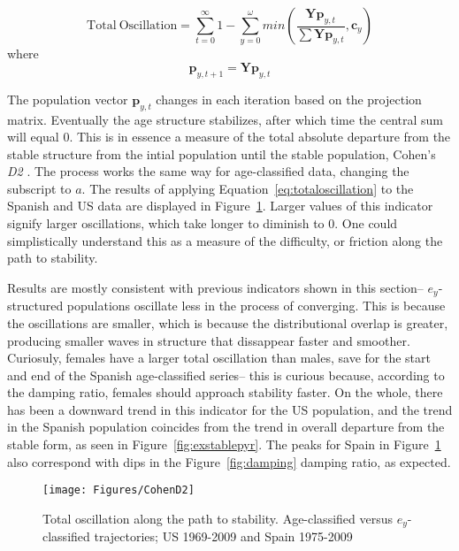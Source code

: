 \begin{equation}
\label{eq:totaloscillation}
\mathrm{Total~Oscillation} = \sum _{t=0} ^\infty 1 - \sum _{y=0} ^\omega
min \left( \frac{\boldsymbol{Y} \boldsymbol{p}_{y,t}}{\sum \boldsymbol{Y}
\boldsymbol{p}_{y,t}}, \boldsymbol{c}_y \right)
\end{equation}
where
\begin{equation}
\boldsymbol{p}_{y,t+1} = \boldsymbol{Y} \boldsymbol{p}_{y,t}
\end{equation}

The population vector $\textbf{p}_{y,t}$ changes in each iteration based on the
projection matrix. Eventually the age structure stabilizes, after which time the central sum will
equal 0. This is in essence a measure of the total absolute departure from the
stable structure from the intial population until the stable population,
Cohen's \textit{D2} \citep{caswell2001matrix}. The process works the same way
for age-classified data, changing the subscript to $a$. The results of applying
Equation~\eqref{eq:totaloscillation} to the Spanish and US data are displayed
in Figure~\ref{fig:exCohenD2}. Larger values of this indicator signify larger
oscillations, which take longer to diminish to 0. One could
simplistically understand this as a measure of the difficulty, or friction along
the path to stability.

Results are mostly consistent with previous indicators shown in this section--
$e_y$-structured populations oscillate less in the process of converging. This
is because the oscillations are smaller, which is because the distributional
overlap is greater, producing smaller waves in structure that dissappear faster
and smoother. Curiosuly, females have a larger total oscillation than males,
save for the start and end of the Spanish age-classified series-- this is
curious because, according to the damping ratio, females should approach
stability faster. On the whole, there has been a downward trend in this
indicator for the US population, and the trend in the Spanish population
coincides from the trend in overall departure from the stable form, as seen in
Figure~\ref{fig:exstablepyr}. The peaks for Spain in Figure~\ref{fig:exCohenD2}
also correspond with dips in the Figure~\ref{fig:damping} damping ratio, as
expected.

\begin{figure}[ht!]
       \centering
       \caption{Total oscillation along the path to
       stability. Age-classified versus $e_y$-classified trajectories; US
       1969-2009 and Spain 1975-2009}
        \texttt{[image: Figures/CohenD2]}
        \label{fig:exCohenD2}
\end{figure}


